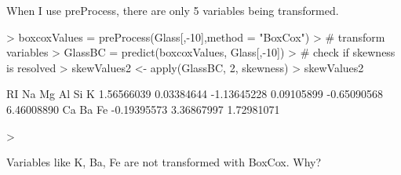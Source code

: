 \documentclass{article}
\begin{document}
When I use preProcess, there are only 5 variables being transformed.
\begin{Schunk}
\begin{Sinput}
> boxcoxValues = preProcess(Glass[,-10],method = "BoxCox")
> # transform variables
> GlassBC = predict(boxcoxValues, Glass[,-10])
> # check if skewness is resolved
> skewValues2 <- apply(GlassBC, 2, skewness)
> skewValues2
\end{Sinput}
\begin{Soutput}
         RI          Na          Mg          Al          Si           K 
 1.56566039  0.03384644 -1.13645228  0.09105899 -0.65090568  6.46008890 
         Ca          Ba          Fe 
-0.19395573  3.36867997  1.72981071 
\end{Soutput}
\begin{Sinput}
> 
\end{Sinput}
\end{Schunk}
Variables like K, Ba, Fe are not transformed with BoxCox.
Why?
\end{document}
